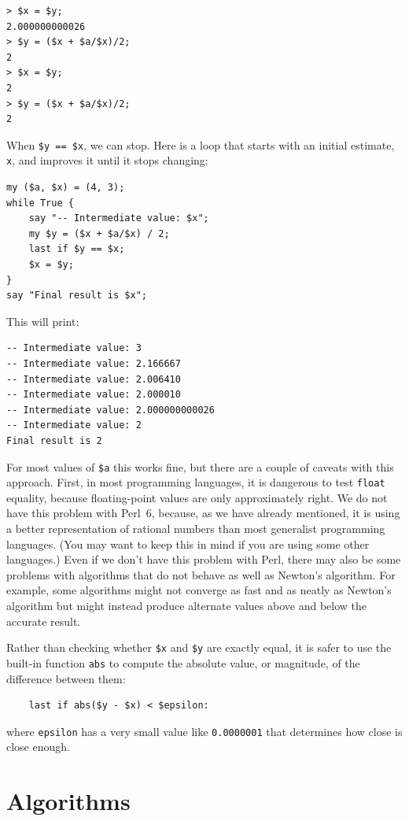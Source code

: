\begin{verbatim}
> $x = $y;
2.000000000026
> $y = ($x + $a/$x)/2;
2
> $x = $y;
2
> $y = ($x + $a/$x)/2;
2
\end{verbatim}
%
When {\tt \$y == \$x}, we can stop.  Here is a loop that starts
with an initial estimate, {\tt x}, and improves it until it
stops changing:

\begin{verbatim}
my ($a, $x) = (4, 3);
while True {
    say "-- Intermediate value: $x";
    my $y = ($x + $a/$x) / 2;
    last if $y == $x;
    $x = $y;
}
say "Final result is $x";
\end{verbatim}
%
This will print:
\begin{verbatim}
-- Intermediate value: 3
-- Intermediate value: 2.166667
-- Intermediate value: 2.006410
-- Intermediate value: 2.000010
-- Intermediate value: 2.000000000026
-- Intermediate value: 2
Final result is 2
\end{verbatim}
%

For most values of {\tt \$a} this works fine, but there are a 
couple of caveats with this approach. First, in most programming 
languages, it is dangerous to test {\tt float} equality, because 
floating-point values are only approximately right. We do not 
have this problem with Perl~6, because, as we have already 
mentioned, it is using a better representation of rational 
numbers than most generalist programming languages. (You 
may want to keep this in mind if you are using some other
languages.) Even if we don't have this problem with Perl, there 
may also be some problems with algorithms that do not behave 
as well as Newton's algorithm. For example, some algorithms 
might not converge as fast and as neatly as Newton's algorithm but might instead produce alternate values above and below the accurate result.

Rather than checking whether {\tt \$x} and {\tt \$y} are exactly equal, it
is safer to use the built-in function {\tt abs} to compute the
absolute value, or magnitude, of the difference between them:

\begin{verbatim}
    last if abs($y - $x) < $epsilon:
\end{verbatim}
%
where \verb"epsilon" has a very small value like {\tt 0.0000001} 
that determines how close is close enough.



\section{Algorithms}

